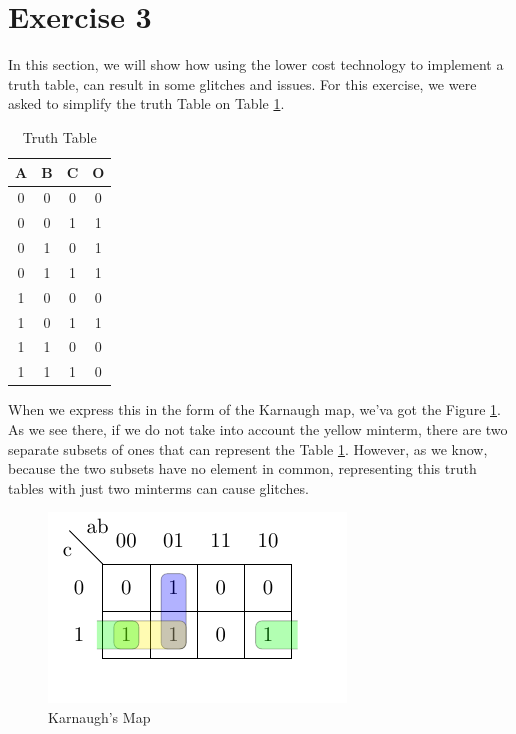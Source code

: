 \section{Exercise 3}

In this section, we will show how using the lower cost technology
to implement a truth table, can result in some glitches and issues.
For this exercise, we were asked to simplify the truth Table on Table
\ref{3_1}.

\begin{table}[H]
\begin{centering}
\begin{tabular}{|c|c|c|c|}
\hline 
A & B & C & O\tabularnewline
\hline 
\hline 
0 & 0 & 0 & 0\tabularnewline
\hline 
0 & 0 & 1 & 1\tabularnewline
\hline 
0 & 1 & 0 & 1\tabularnewline
\hline 
0 & 1 & 1 & 1\tabularnewline
\hline 
1 & 0 & 0 & 0\tabularnewline
\hline 
1 & 0 & 1 & 1\tabularnewline
\hline 
1 & 1 & 0 & 0\tabularnewline
\hline 
1 & 1 & 1 & 0\tabularnewline
\hline 
\end{tabular}
\par\end{centering}
\caption{Truth Table}
\label{3_1}

\end{table}

When we express this in the form of the Karnaugh map, we'va got the
Figure \ref{3_2}. As we see there, if we do not take into account
the yellow minterm, there are two separate subsets of ones that can
represent the Table \ref{3_1}. However, as we know, because the two
subsets have no element in common, representing this truth tables
with just two minterms can cause glitches.

\begin{figure}[H]
\begin{centering}
\includegraphics{images/Karnaugh}
\par\end{centering}
\caption{Karnaugh's Map}
\label{3_2}

\end{figure}

